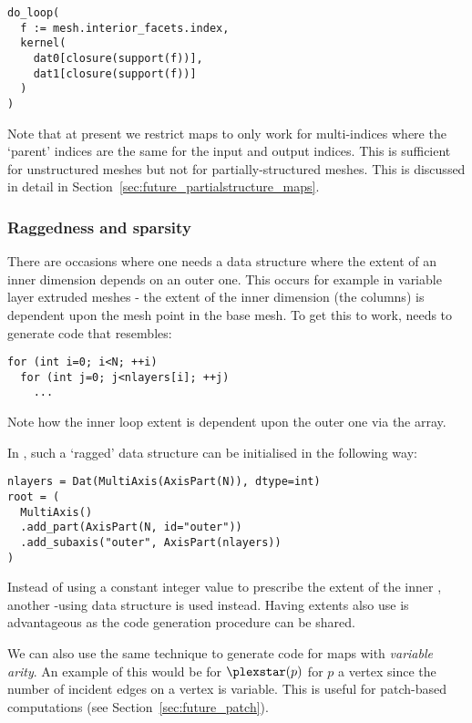 \begin{verbatim}
do_loop(
  f := mesh.interior_facets.index,
  kernel(
    dat0[closure(support(f))],
    dat1[closure(support(f))]
  )
)
\end{verbatim}

Note that at present we restrict maps to only work for multi-indices where the `parent' indices are the same for the input and output indices.
This is sufficient for unstructured meshes but not for partially-structured meshes.
This is discussed in detail in Section~\ref{sec:future_partialstructure_maps}.

\subsubsection{Raggedness and sparsity}
\label{sec:impl_datalayout_ragged}

There are occasions where one needs a data structure where the extent of an inner dimension depends on an outer one.
This occurs for example in variable layer extruded meshes - the extent of the inner dimension (the columns) is dependent upon the mesh point in the base mesh.
To get this to work,  needs to generate code that resembles:

\begin{verbatim}
for (int i=0; i<N; ++i)
  for (int j=0; j<nlayers[i]; ++j)
    ...
\end{verbatim}

Note how the inner loop extent is dependent upon the outer one via the  array.

In , such a `ragged' data structure can be initialised in the following way:

\begin{verbatim}
nlayers = Dat(MultiAxis(AxisPart(N)), dtype=int)
root = (
  MultiAxis()
  .add_part(AxisPart(N, id="outer"))
  .add_subaxis("outer", AxisPart(nlayers))
)
\end{verbatim}

Instead of using a constant integer value to prescribe the extent of the inner , another -using data structure is used instead.
Having extents also use  is advantageous as the code generation procedure can be shared.

We can also use the same technique to generate code for maps with \textit{variable arity}.
An example of this would be for $\plexstar(p)$ for $p$ a vertex since the number of incident edges on a vertex is variable.
This is useful for patch-based computations (see Section~\ref{sec:future_patch}).

